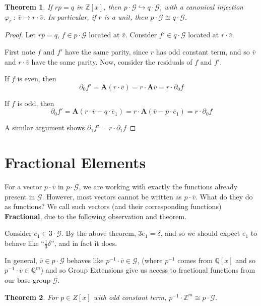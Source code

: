 \documentclass[12pt]{article}
\newcommand{\G}{\mathcal{G}}
\newcommand{\Z}{\mathbb{Z}}
\newcommand{\Q}{\mathbb{Q}}
\newcommand{\2}{\textbf{2}}
\newcommand{\Am}{\textbf{A}}
\newcommand{\del}{\partial}
\renewcommand{\v}{\bar{v}}
\newcommand{\e}{\bar{e}}
\newtheorem{thm}{Theorem}
\begin{document}
\begin{thm}
  If $rp = q$ in $\Z[x]$, then $p \cdot \G \hookrightarrow q \cdot \G$, 
  with a canonical injection $\varphi_r~:~\v \mapsto r \cdot \v$. 
  In particular, if $r$ is a unit, then $p \cdot \G \cong q \cdot \G$.
\end{thm}

\begin{proof}
  Let $rp = q$, $f \in p \cdot \G$ located at $\v$.
  Consider $f' \in q \cdot \G$ located at $r \cdot \v$.

  First note $f$ and $f'$ have the same parity, since 
  $r$ has odd constant term, and so $\v$ and $r \cdot \v$
  have the same parity. Now, consider the residuals of $f$ and $f'$. 
  
  If $f$ is even, then 
  \[ \del_0 f' = \Am (r \cdot \v) = r \cdot \Am \v = r \cdot \del_0 f \]

  If $f$ is odd, then
  \[ \del_0 f' = \Am (r \cdot \v - q \cdot \e_1) 
               = r \cdot \Am (\v - p \cdot \e_1)
               = r \cdot \del_0 f \]

  A similar argument shows $\del_1 f' = r \cdot \del_1 f$
\end{proof}

\section{Fractional Elements}
For a vector $p \cdot \v$ in $p \cdot \G$, we are working with exactly
the functions already present in $\G$. However, most vectors cannot be written
as $p \cdot \v$. What do they do as functions?
We call such vectors (and their corresponding functions)
\textbf{Fractional}, due to the following observation and theorem.

Consider $\e_1 \in 3 \cdot \G$. By the above theorem, $3\e_1 = \delta$,
and so we should expect $\e_1$ to behave like ``$\frac{1}{3}\delta$'', 
and in fact it does.

In general, $\v \in p \cdot \G$ behaves like $p^{-1} \cdot \v \in \G$,
(where $p^{-1}$ comes from $\Q[x]$ and so $p^{-1} \cdot \v \in \Q^m$)
and so Group Extensions give us access to fractional functions from 
our base group $\G$.

\begin{thm}
  For $p \in Z[x]$ with odd constant term, 
  $p^{-1} \cdot \Z^m \cong p \cdot \G$.
\end{thm}
\end{document}
